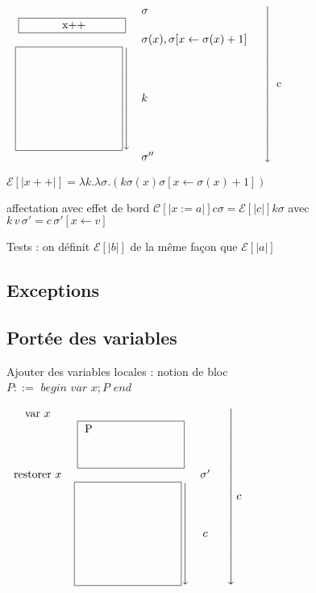 \documentclass[10pt,a4paper]{article}
\newcommand{\E}{\mathcal{E}}
\newcommand{\semm}[1]{\left[| #1 | \right]}
\begin{document}
\begin{ex}
 
$\left.\begin{array}{c l l}
 & \sigma & \\
 \fbox{
 \begin{minipage}{3cm}
 \centering x++
 \end{minipage}} & \\
& \sigma(x), \sigma[x \leftarrow \sigma(x)+1] & \\
\left.\fbox{
 \begin{minipage}{3cm}
\vspace{3cm} \quad
 \end{minipage}}\right\downarrow &   k& \\
& \sigma'' & \\
\end{array}\right\downarrow$ c

$\E\semm{x++} = \lambda k. \lambda \sigma . (k \sigma(x) \sigma[x \leftarrow \sigma(x) +1])$

affectation avec effet de bord
$\mathcal{C}\semm{x:=a} c \sigma = \E\semm{c} k \sigma$ avec $k \, v\,  \sigma' = c \, \sigma'[x \leftarrow v]$ 
\end{ex}

Tests : on définit $\E \semm{b}$ de la même façon que  $\E \semm{a}$

\subsection{Exceptions}

\subsection{Portée des variables}
Ajouter des variables locales : notion de bloc \\
$P ::=$ $begin$ $var$ $x; P$ $end$


$\left.\begin{array}{c c c c}
 \text{var }x \\
& \fbox{
 \begin{minipage}{3cm}
 P \vspace{1cm}
 \end{minipage}}\\
\text{restorer }x & &\sigma' & \\
&  \left.\fbox{
\begin{minipage}{3cm}
\vspace{3cm} \quad
 \end{minipage}} \right\downarrow  &  c \\
\end{array}\right\downarrow c$
\end{document}
